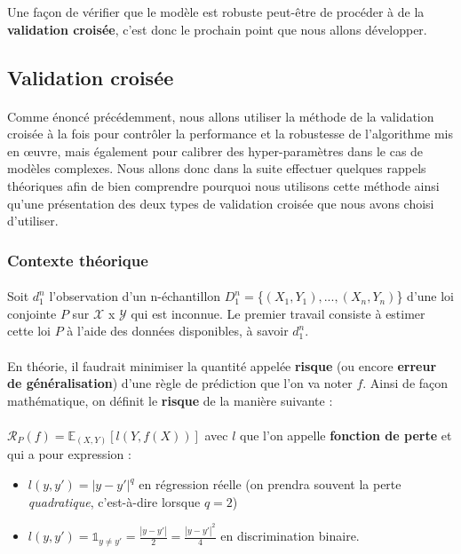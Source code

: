 \documentclass[14pt, openany]{article}
\begin{document}
Une façon de vérifier que le modèle est robuste peut-être de procéder à de la \textbf{validation croisée}, c'est donc le prochain point que nous allons développer.
 
\subsection{Validation croisée}
\paragraph{}
Comme énoncé précédemment, nous allons utiliser la méthode de la validation croisée à la fois pour contrôler la performance et la robustesse de l'algorithme mis en œuvre, mais également pour calibrer des hyper-paramètres dans le cas de modèles complexes. Nous allons donc dans la suite effectuer quelques rappels théoriques afin de bien comprendre pourquoi nous utilisons cette méthode ainsi qu'une présentation des deux types de validation croisée que nous avons choisi d'utiliser.

\subsubsection{Contexte théorique}
\paragraph{}
Soit $d^{n}_{1}$ l'observation d'un n-échantillon $D^{n}_{1} =$\{$(X_1,Y_1),...,(X_n,Y_n)$\} d'une loi conjointe $P$ sur $\mathcal{X}$ x $\mathcal{Y}$ qui est inconnue. Le premier travail consiste à estimer cette loi $P$ à l'aide des données disponibles, à savoir $d^{n}_{1}$.
\paragraph{}
En théorie, il faudrait minimiser la quantité appelée \textbf{risque} (ou encore \textbf{erreur de généralisation}) d'une règle de prédiction que l'on va noter $f$. Ainsi de façon mathématique, on définit le \textbf{risque} de la manière suivante :
\paragraph{}
$\mathcal{R}_P(f) = \mathbb{E}_{(X,Y)}[l(Y,f(X))]$ avec $l$ que l'on appelle \textbf{fonction de perte} et qui a pour expression :
\begin{itemize}
\item $l(y,y') = |y-y'|^q$ en régression réelle (on prendra souvent la perte \textit{quadratique}, c'est-à-dire lorsque $q=2$)
\item $l(y,y') = \mathds{1}_{y \neq y'} = \frac{|y-y'|}{2} = \frac{|y-y'|^2}{4}$ en discrimination binaire.
\end{itemize}
\end{document}
